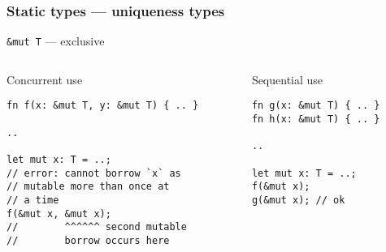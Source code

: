 \documentclass[t]{beamer}
\begin{document}
\begin{frame}[fragile]
\frametitle{Static types --- uniqueness types}

\texttt{\&mut T} --- exclusive
  
\begin{columns}

\begin{column}[T]{0.48\textwidth}
\begin{block}{Concurrent use}
\small
\begin{verbatim}
fn f(x: &mut T, y: &mut T) { .. }

..

let mut x: T = ..;
// error: cannot borrow `x` as
// mutable more than once at
// a time
f(&mut x, &mut x);
//        ^^^^^^ second mutable
//        borrow occurs here 
\end{verbatim}
\end{block}
\end{column}

\begin{column}[T]{0.48\textwidth}
\begin{block}{Sequential use}
\small
\begin{verbatim}
fn g(x: &mut T) { .. }
fn h(x: &mut T) { .. }

..

let mut x: T = ..;
f(&mut x);
g(&mut x); // ok
\end{verbatim}
\end{block}
\end{column}

\end{columns}

\end{frame}
\end{document}
